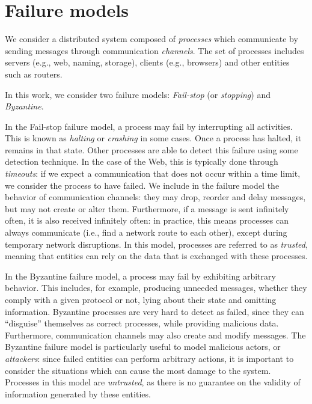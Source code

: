 \documentclass[mscthesis]{usiinfthesis}
\begin{document}
\section{Failure models}

We consider a distributed system composed of \emph{processes} which communicate by sending messages through communication \emph{channels}.
The set of processes includes servers (e.g., web, naming, storage), clients (e.g., browsers) and other entities such as routers.

In this work, we consider two failure models: \emph{Fail-stop} (or \emph{stopping}) and \emph{Byzantine}.

In the Fail-stop failure model, a process may fail by interrupting all activities. This is known as \emph{halting} or \emph{crashing} in some cases. Once a process has halted, it remains in that state. Other processes are able to detect this failure using some detection technique. In the case of the Web, this is typically done through \emph{timeouts}: if we expect a communication that does not occur within a time limit, we consider the process to have failed.
We include in the failure model the behavior of communication channels: they may drop, reorder and delay messages, but may not create or alter them.
Furthermore, if a message is sent infinitely often, it is also received infinitely often: in practice, this means processes can always communicate (i.e., find a network route to each other), except during temporary network disruptions.
In this model, processes are referred to as \emph{trusted}, meaning that entities can rely on the data that is exchanged with these processes.

In the Byzantine failure model, a process may fail by exhibiting arbitrary behavior. This includes, for example, producing unneeded messages, whether they comply with a given protocol or not, lying about their state and omitting information. Byzantine processes are very hard to detect as failed, since they can ``disguise'' themselves as correct processes, while providing malicious data.
Furthermore, communication channels may also create and modify messages.
The Byzantine failure model is particularly useful to model malicious actors, or \emph{attackers}: since failed entities can perform arbitrary actions, it is important to consider the situations which can cause the most damage to the system.
Processes in this model are \emph{untrusted}, as there is no guarantee on the validity of information generated by these entities.
\end{document}

